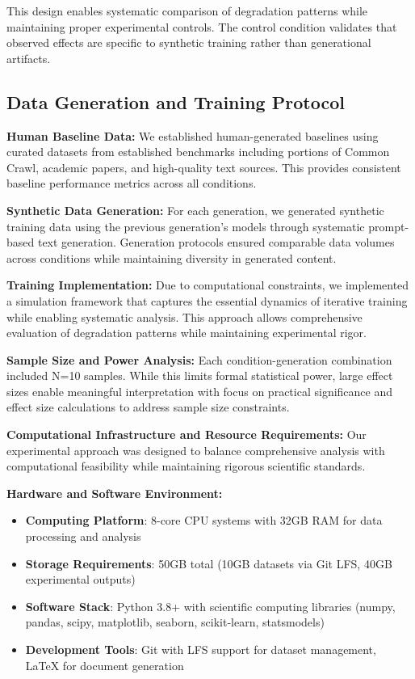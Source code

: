 \documentclass{article}
\begin{document}
This design enables systematic comparison of degradation patterns while maintaining proper experimental controls. The control condition validates that observed effects are specific to synthetic training rather than generational artifacts.

\subsection{Data Generation and Training Protocol}

\textbf{Human Baseline Data:} We established human-generated baselines using curated datasets from established benchmarks including portions of Common Crawl, academic papers, and high-quality text sources. This provides consistent baseline performance metrics across all conditions.

\textbf{Synthetic Data Generation:} For each generation, we generated synthetic training data using the previous generation's models through systematic prompt-based text generation. Generation protocols ensured comparable data volumes across conditions while maintaining diversity in generated content.

\textbf{Training Implementation:} Due to computational constraints, we implemented a simulation framework that captures the essential dynamics of iterative training while enabling systematic analysis. This approach allows comprehensive evaluation of degradation patterns while maintaining experimental rigor.

\textbf{Sample Size and Power Analysis:} Each condition-generation combination included N=10 samples. While this limits formal statistical power, large effect sizes enable meaningful interpretation with focus on practical significance and effect size calculations to address sample size constraints.

\textbf{Computational Infrastructure and Resource Requirements:} Our experimental approach was designed to balance comprehensive analysis with computational feasibility while maintaining rigorous scientific standards.

\textbf{Hardware and Software Environment:}
\begin{itemize}
    \item \textbf{Computing Platform}: 8-core CPU systems with 32GB RAM for data processing and analysis
    \item \textbf{Storage Requirements}: 50GB total (10GB datasets via Git LFS, 40GB experimental outputs)
    \item \textbf{Software Stack}: Python 3.8+ with scientific computing libraries (numpy, pandas, scipy, matplotlib, seaborn, scikit-learn, statsmodels)
    \item \textbf{Development Tools}: Git with LFS support for dataset management, LaTeX for document generation
\end{itemize}
\end{document}
